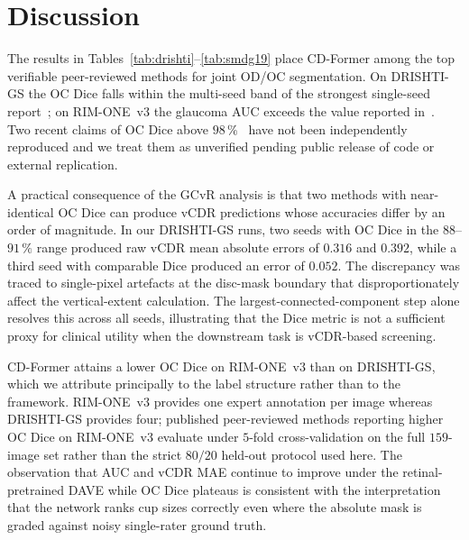 \documentclass[runningheads]{llncs}
\begin{document}
\section{Discussion}

The results in Tables~\ref{tab:drishti}--\ref{tab:smdg19} place CD-Former among the top verifiable peer-reviewed methods for joint OD/OC segmentation. On DRISHTI-GS the OC Dice falls within the multi-seed band of the strongest single-seed report~\cite{edcoatunet2025}; on RIM-ONE~v3 the glaucoma AUC exceeds the value reported in~\cite{li2023rdcnn}. Two recent claims of OC Dice above $98\,\%$~\cite{dbsegnet2025,dualoptitrans2026} have not been independently reproduced and we treat them as unverified pending public release of code or external replication.

A practical consequence of the GCvR analysis is that two methods with near-identical OC Dice can produce vCDR predictions whose accuracies differ by an order of magnitude. In our DRISHTI-GS runs, two seeds with OC Dice in the $88$--$91\,\%$ range produced raw vCDR mean absolute errors of $0.316$ and $0.392$, while a third seed with comparable Dice produced an error of $0.052$. The discrepancy was traced to single-pixel artefacts at the disc-mask boundary that disproportionately affect the vertical-extent calculation. The largest-connected-component step alone resolves this across all seeds, illustrating that the Dice metric is not a sufficient proxy for clinical utility when the downstream task is vCDR-based screening.

CD-Former attains a lower OC Dice on RIM-ONE~v3 than on DRISHTI-GS, which we attribute principally to the label structure rather than to the framework. RIM-ONE~v3 provides one expert annotation per image whereas DRISHTI-GS provides four; published peer-reviewed methods reporting higher OC Dice on RIM-ONE~v3 evaluate under $5$-fold cross-validation on the full $159$-image set rather than the strict $80/20$ held-out protocol used here. The observation that AUC and vCDR MAE continue to improve under the retinal-pretrained DAVE while OC Dice plateaus is consistent with the interpretation that the network ranks cup sizes correctly even where the absolute mask is graded against noisy single-rater ground truth.
\end{document}
